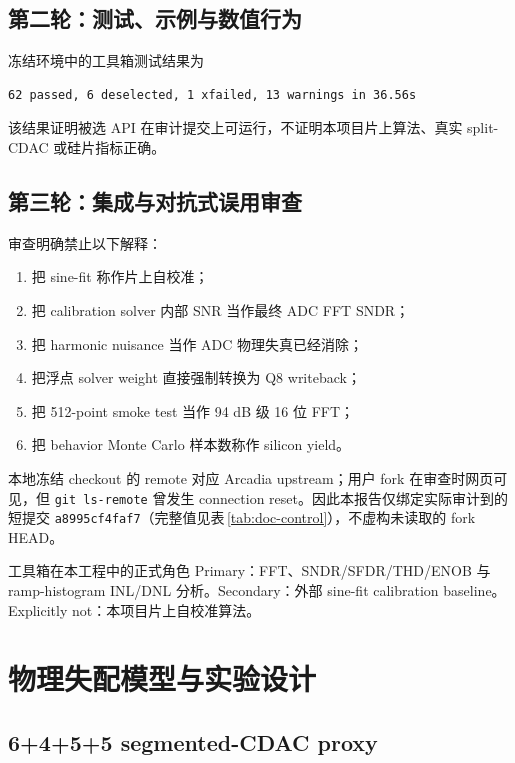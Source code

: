 \documentclass[UTF8,fontset=none,a4paper,11pt,openany]{ctexrep}
\begin{document}
\section{第二轮：测试、示例与数值行为}

冻结环境中的工具箱测试结果为
\begin{lstlisting}
62 passed, 6 deselected, 1 xfailed, 13 warnings in 36.56s
\end{lstlisting}
该结果证明被选 API 在审计提交上可运行，不证明本项目片上算法、真实 split-CDAC 或硅片指标正确。

\section{第三轮：集成与对抗式误用审查}

审查明确禁止以下解释：
\begin{enumerate}
  \item 把 sine-fit 称作片上自校准；
  \item 把 calibration solver 内部 SNR 当作最终 ADC FFT SNDR；
  \item 把 harmonic nuisance 当作 ADC 物理失真已经消除；
  \item 把浮点 solver weight 直接强制转换为 Q8 writeback；
  \item 把 512-point smoke test 当作 94 dB 级 16 位 FFT；
  \item 把 behavior Monte Carlo 样本数称作 silicon yield。
\end{enumerate}
本地冻结 checkout 的 remote 对应 Arcadia upstream；用户 fork 在审查时网页可见，但 \texttt{git ls-remote} 曾发生 connection reset。因此本报告仅绑定实际审计到的短提交 \texttt{a8995cf4faf7}（完整值见表\,\ref{tab:doc-control}），不虚构未读取的 fork HEAD。

\begin{evidencebox}{工具箱在本工程中的正式角色}
Primary：FFT、SNDR/SFDR/THD/ENOB 与 ramp-histogram INL/DNL 分析。Secondary：外部 sine-fit calibration baseline。Explicitly not：本项目片上自校准算法。
\end{evidencebox}

\chapter{物理失配模型与实验设计}

\section{6+4+5+5 segmented-CDAC proxy}
\end{document}
